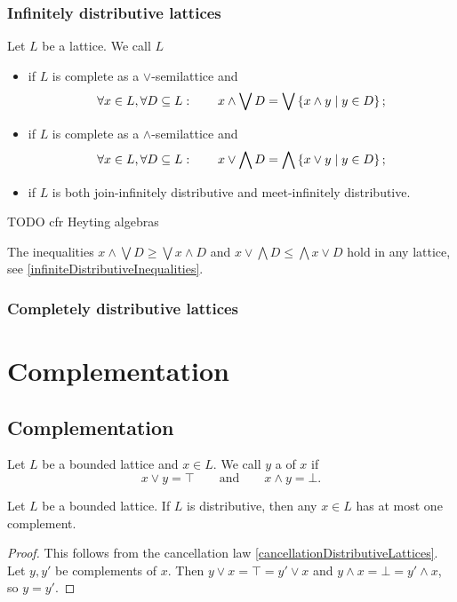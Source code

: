 \subsubsection{Infinitely distributive lattices}
\begin{definition}
Let $L$ be a lattice. We call $L$
\begin{itemize}
\item {} if $L$ is complete as a $\vee$-semilattice and
\[ \forall x\in L, \forall D\subseteq L: \qquad x\wedge \bigvee D = \bigvee\left\{ x\wedge y \;\middle|\; y\in D \right\}; \]
\item {} if $L$ is complete as a $\wedge$-semilattice and
\[ \forall x\in L, \forall D\subseteq L: \qquad x\vee \bigwedge D = \bigwedge\left\{ x\vee y \;\middle|\; y\in D \right\}; \]
\item {} if $L$ is both join-infinitely distributive and meet-infinitely distributive.
\end{itemize}
\end{definition}
TODO cfr Heyting algebras

The inequalities $x\wedge \bigvee D \geq \bigvee x\wedge D$ and $x\vee \bigwedge D \leq \bigwedge x\vee D$ hold in any lattice, see \ref{infiniteDistributiveInequalities}.



\subsubsection{Completely distributive lattices}

\section{Complementation}
\subsection{Complementation}
\begin{definition}
Let $L$ be a bounded lattice and $x\in L$. We call $y$ a  of $x$ if
\[ x \vee y = \top \qquad \text{and} \qquad x\wedge y = \bot. \]
\end{definition}

\begin{proposition} \label{distributiveComplementUnique}
Let $L$ be a bounded lattice. If $L$ is distributive, then any $x\in L$ has at most one complement.
\end{proposition}
\begin{proof}
This follows from the cancellation law \ref{cancellationDistributiveLattices}. Let $y,y'$ be complements of $x$. Then $y\vee x = \top = y'\vee x$ and $y\wedge x = \bot = y'\wedge x$, so $y=y'$.
\end{proof}

